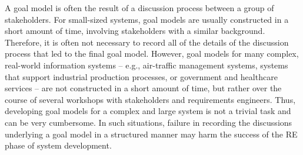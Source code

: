 


A goal model is often the result of a discussion process between a group of stakeholders. For small-sized systems, goal models are usually constructed in a short amount of time, involving stakeholders with a similar background. Therefore, it is often not necessary to record all of the details of the discussion process that led to the final goal model. However, goal models for many complex, real-world information systems -- e.g., air-traffic management systems, systems that support industrial production processes, or government and healthcare services -- are not constructed in a short amount of time, but rather over the course of several workshops with stakeholders and requirements engineers.  %
Thus, developing goal models for a complex and large system is not a trivial task and can be very cumbersome. In such situations, failure in recording the discussions underlying a goal model in a structured manner may harm the success of the RE phase of system development. 


